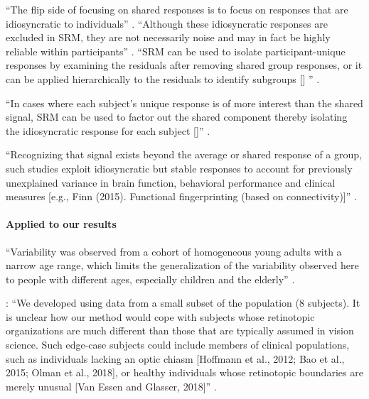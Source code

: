 %
``The flip side of focusing on shared responses is to focus on responses that
are idiosyncratic to individuals'' \citep{cohen2017computational}.
%
``Although these idiosyncratic responses are excluded in SRM, they are not
necessarily noise and may in fact be highly reliable within participants''
\citep{cohen2017computational}.
%
``SRM can be used to isolate participant-unique responses by examining the
residuals after removing shared group responses, or it can be applied
hierarchically to the residuals to identify subgroups [\citet{chen2017shared}]
'' \citep{cohen2017computational}.

%
``In cases where each subject's unique response is of more interest than the
shared signal, SRM can be used to factor out the shared component thereby
isolating the idiosyncratic response for each subject
[\citep{chen2015reduced}]'' \citep{kumar2020brainiak}.

%
``Recognizing that signal exists beyond the average or shared response of a
group, such studies exploit idiosyncratic but stable responses to account for
previously unexplained variance in brain function, behavioral performance and
clinical measures [e.g., Finn (2015). Functional fingerprinting (based on
connectivity)]'' \citep{cohen2017computational}.


\paragraph{Applied to our results}


%
``Variability was observed from a cohort of homogeneous young adults with a
narrow age range, which limits the generalization of the variability observed
here to people with different ages, especially children and the elderly''
\citet{zhen2017quantifying}.


\citet{benson2018bayesian}: ``We developed using data from a small subset of the
population (8 subjects).
%
It is unclear how our method would cope with subjects whose retinotopic
organizations are much different than those that are typically assumed in vision
science.
%
Such edge-case subjects could include members of clinical populations, such as
individuals lacking an optic chiasm [Hoffmann et al., 2012; Bao et al., 2015;
Olman et al., 2018], or healthy individuals whose retinotopic boundaries are
merely unusual [Van Essen and Glasser, 2018]'' \citep{benson2018bayesian}.



